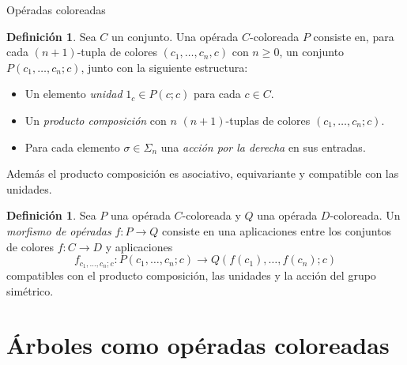 \documentclass[12pt,aspectratio=169]{beamer}
\numberwithin{equation}{section}
\theoremstyle{definition}
\newtheorem{defi}[teo]{Definici\'on}
\begin{document}
\begin{frame}{Op\'eradas coloreadas}
    \begin{defi}
        Sea $C$ un conjunto. Una op\'erada $C$-coloreada $P$ consiste en, para cada $(n+1)$-tupla de colores $(c_1,\ldots,c_n,c)$ con $n\ge 0$, un conjunto $P(c_1,\ldots, c_n;c)$, junto con la siguiente estructura:
        \begin{itemize}
            \item Un elemento \emph{unidad} $1_c\in P(c;c)$ para cada $c\in C$.
            \item Un \emph{producto composici\'on} con $n$ $(n+1)$-tuplas de colores $(c_1,\dots,c_n;c)$.
            \item Para cada elemento $\sigma\in\Sigma_n$ una \emph{acci\'on por la derecha} en sus entradas.
        \end{itemize}
        Adem\'as el producto composici\'on es asociativo, equivariante y compatible con las unidades.
    \end{defi}
    \begin{defi}
        Sea $P$ una op\'erada $C$-coloreada y $Q$ una op\'erada $D$-coloreada. Un \emph{morfismo de op\'eradas} $f\colon P\to Q$ consiste en una aplicaciones entre los conjuntos de colores $f\colon C\to D$ y aplicaciones
        $$
            f_{c_1,\dots,c_n;c}: P(c_1,\dots,c_n;c) \longrightarrow Q(f(c_1),\dots,f(c_n);c)
        $$
        compatibles con el producto composici\'on, las unidades y la acci\'on del grupo sim\'etrico.
    \end{defi}
    
\end{frame}

\section{\'Arboles como op\'eradas coloreadas}
\end{document}
